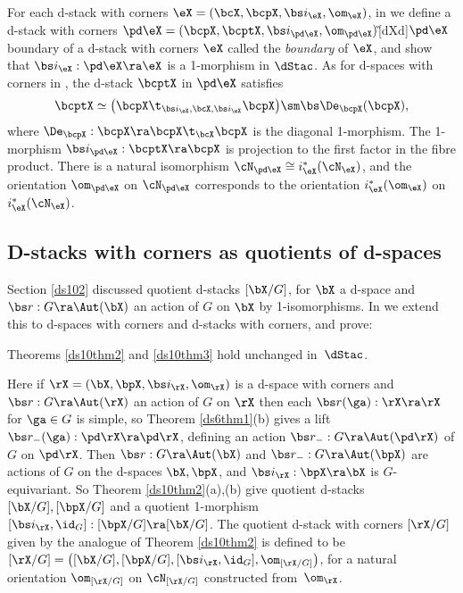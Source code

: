 \documentclass{article}
\begin{document}
For each d-stack with corners $\eX=(\bcX,\bcpX,\bs i_\eX,\om_\eX)$,
in \cite[\S 11.3]{Joyc6} we define a d-stack with corners
$\pd\eX=(\bcpX, \bcptX,\bs
i_{\pd\eX},\om_{\pd\eX})$\G[dXd]{$\pd\eX$}{boundary of a d-stack
with corners $\eX$} called the {\it boundary\/} of $\eX$,
and show that $\bs i_\eX:\pd\eX\ra\eX$ is a 1-morphism in $\dStac$.
As for d-spaces with corners in , the d-stack $\bcptX$ in
$\pd\eX$ satisfies
\begin{equation*}
\bcptX\simeq\bigl(\bcpX\t_{\bs i_\eX,\bcX,\bs i_\eX}\bcpX\bigr)
\sm\bs\De_\bcpX(\bcpX),
\end{equation*}
where $\De_\bcpX:\bcpX\ra\bcpX\t_\bcX\bcpX$ is the diagonal
1-morphism. The 1-morphism $\bs i_{\pd\eX}:\bcptX\ra\bcpX$ is
projection to the first factor in the fibre product. There is a
natural isomorphism $\cN_{\pd\eX}\cong i_\eX^*(\cN_\eX)$, and the
orientation $\om_{\pd\eX}$ on $\cN_{\pd\eX}$ corresponds to the
orientation $i_\eX^*(\om_\eX)$ on~$i_\eX^*(\cN_\eX)$.

\subsection[D-stacks with corners as quotients of d-spaces with
corners]{D-stacks with corners as quotients of d-spaces}
\label{ds132}

Section \ref{ds102} discussed quotient d-stacks $[\bX/G]$, for $\bX$
a d-space and $\bs r:G\ra\Aut(\bX)$ an action of $G$ on $\bX$ by
1-isomorphisms. In \cite[\S 11.2]{Joyc6} we extend this to d-spaces
with corners and d-stacks with corners, and prove:

\begin{thm} Theorems\/ {\rm\ref{ds10thm2}} and\/
{\rm\ref{ds10thm3}} hold unchanged in\/~$\dStac$.
\label{ds13thm1}
\end{thm}

Here if $\rX=(\bX,\bpX,\bs i_\rX,\om_\rX)$ is a d-space with corners
and $\bs r:G\ra\Aut(\rX)$ an action of $G$ on $\rX$ then each $\bs
r(\ga):\rX\ra\rX$ for $\ga\in G$ is simple, so Theorem
\ref{ds6thm1}(b) gives a lift $\bs r_-(\ga):\pd\rX\ra\pd\rX$,
defining an action $\bs r_-:G\ra\Aut(\pd\rX)$ of $G$ on $\pd\rX$.
Then $\bs r:G\ra\Aut(\bX)$ and $\bs r_-:G\ra\Aut(\bpX)$ are actions
of $G$ on the d-spaces $\bX,\bpX$, and $\bs i_\rX:\bpX\ra\bX$ is
$G$-equivariant. So Theorem \ref{ds10thm2}(a),(b) give quotient
d-stacks $[\bX/G],[\bpX/G]$ and a quotient 1-morphism $[\bs
i_\rX,\id_G]: [\bpX/G]\ra[\bX/G]$. The quotient d-stack with corners
$[\rX/G]$ given by the analogue of Theorem \ref{ds10thm2} is defined
to be $[\rX/G]=\bigl([\bX/G],[\bpX/G],[\bs
i_\rX,\id_G],\om_{[\rX/G]}\bigr)$, for a natural orientation
$\om_{[\rX/G]}$ on $\cN_{[\rX/G]}$ constructed from~$\om_\rX$.
\end{document}
